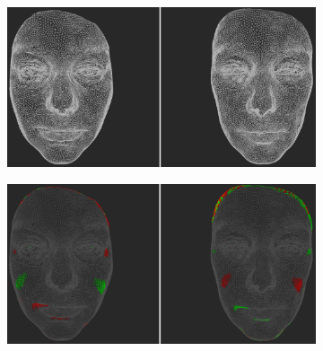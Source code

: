 \begin{figure}[h]
\centering
\begin{subfigure}{0.49\textwidth}
\includegraphics[width=\textwidth]{./img-study/pair6.PNG}
\caption{}
\label{fig:study-2-6}
\end{subfigure}
\begin{subfigure}{0.49\textwidth}
\includegraphics[width=\textwidth]{./img-study/pair8.PNG}
\caption{}
\label{fig:study-2-8}
\end{subfigure}


\end{figure}
